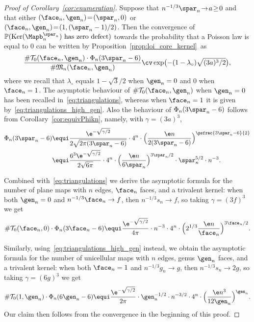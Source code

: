 \begin{proof}[Proof of Corollary~\ref{cor:enumeration}]
Suppose that $n^{-1/3} \spar_n \!\to\! a \!\ge\! 0$ and that either $(\face_n, \gen_n) \!=\! (\spar_n, 0)$ or $(\face_n, \gen_n) \!=\! (1, (\spar_n-1)/2)$. Then the convergence of $\mathbb{P}(\mathrm{Ker}(\Mapb_{n}^{\spar_{n}}) \mbox{ has zero defect})$ towards the probability that a Poisson law is equal to $0$ can be written by Proposition~\ref{prop:loi_core_kernel}~as
\[
\frac{\# \mathcal{T}_0(\face_n,\gen_n) \cdot \Phi_{n}(3\spar_n-6 )}{\# \mathfrak{M}_n(\face_n,\gen_n)}
\cv \exp\bigl(- (1-\lambda_{\circ}) \sqrt{(3a)^3 / 2}\bigr),
\]
where we recall that $\lambda_\circ$ equals $1 - \sqrt{3}/2$ when $\gen_n=0$ and $0$ when $\face_n=1$.
The asymptotic behaviour of $\# \mathcal{T}_0(\face_n,\gen_n)$ when $\gen_n=0$ has been recalled in~\eqref{eq:triangulations}, whereas when $\face_n=1$ it is given by~\eqref{eq:triangulations_high_gen}. Also the behaviour of $\Phi_{n}(3\spar_n-6 )$ follows from Corollary~\ref{cor:equivPhikn}, namely, with $\gamma = (3a)^3$,\vspace*{-3pt}
\begin{align*}
\Phi_{n}(3 \spar_{n}-6)
& \equi \frac{\e^{- \sqrt{\gamma/2}}}{2\sqrt{2 \pi (3\spar_{n}-6)}} \cdot 4^{n} \cdot \Bigl(\frac{\e n}{2 (3\spar_{n}-6)}\Bigr)^{ \psfrac{3\spar_{n}-6}{2}}
\\
& \equi \frac{6^3 \e^{- \sqrt{\gamma/2}}}{2\sqrt{6 \pi}} \cdot 4^{n} \cdot \Bigl(\frac{\e n}{6 \spar_{n}}\Bigr)^{3\spar_{n}/2} \cdot \spar_{n}^{5/2} \cdot n^{-3}.
\end{align*}

Combined with~\eqref{eq:triangulations} we derive the asymptotic formula for the number of plane maps with $n$ edges, $\face_n$ faces, and a trivalent kernel: when both $\gen_n=0$ and $n^{-1/3} \face_n \to f$, then $n^{-1/3} s_{n} \rightarrow f$, so taking $\gamma=(3f)^{3}$ we get
\[
\#\mathcal{T}_0(\face_n,0) \cdot \Phi_{n}(3 \face_{n}-6)
\equi \frac{\e^{- \sqrt{\gamma/2}}}{4 \pi} \cdot n^{-3} \cdot 4^{n} \cdot \Bigl(2^{1/3} \frac{\e n}{\face_{n}}\Bigr)^{3\face_{n}/2}.
\]

Similarly, using~\eqref{eq:triangulations_high_gen} instead, we obtain the asymptotic formula for the number of unicellular maps with $n$ edges, genus $\gen_n$ faces, and a trivalent kernel: when both $\face_n=1$ and $n^{-1/3} g_{n} \rightarrow g$, then $n^{-1/3} s_{n} \rightarrow 2g$, so taking $\gamma=(6g)^{3}$ we get
\[
\#\mathcal{T}_0(1,\gen_n) \cdot \Phi_{n}(6 \gen_{n}-6)
\equi \frac{ \e^{- \sqrt{\gamma/2}}}{2\pi } \cdot \gen_n^{-1/2} \cdot n^{-3/2} \cdot 4^{n} \cdot \Bigl(\frac{\e n^3}{12 \gen_n}\Bigr)^{\gen_n}.
\]
Our claim then follows from the convergence in the beginning of this proof.
\end{proof}


